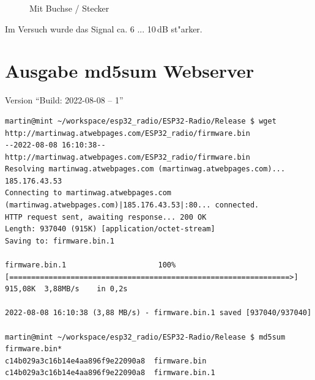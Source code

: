\documentclass[ngerman,11pt,parskip=half] {scrartcl}
\begin{document}
\begin{figure}[H]
\centering
{}
\caption{Mit Buchse / Stecker} \label{fig:1}
\end{figure}
                                                        
Im Versuch wurde das Signal ca. 6 ... 10\,dB st"arker.

\appendix

\section{Ausgabe md5sum Webserver}

Version "`Build: 2022-08-08 -- 1"'

\begin{lstlisting}
martin@mint ~/workspace/esp32_radio/ESP32-Radio/Release $ wget http://martinwag.atwebpages.com/ESP32_radio/firmware.bin
--2022-08-08 16:10:38--  http://martinwag.atwebpages.com/ESP32_radio/firmware.bin
Resolving martinwag.atwebpages.com (martinwag.atwebpages.com)... 185.176.43.53
Connecting to martinwag.atwebpages.com (martinwag.atwebpages.com)|185.176.43.53|:80... connected.
HTTP request sent, awaiting response... 200 OK
Length: 937040 (915K) [application/octet-stream]
Saving to: firmware.bin.1

firmware.bin.1                     100%[================================================================>] 915,08K  3,88MB/s    in 0,2s    

2022-08-08 16:10:38 (3,88 MB/s) - firmware.bin.1 saved [937040/937040]

martin@mint ~/workspace/esp32_radio/ESP32-Radio/Release $ md5sum firmware.bin*
c14b029a3c16b14e4aa896f9e22090a8  firmware.bin
c14b029a3c16b14e4aa896f9e22090a8  firmware.bin.1
\end{lstlisting}
\end{document}
